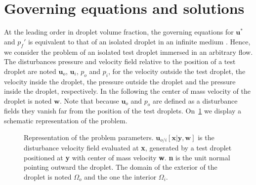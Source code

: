 



\section{Governing equations and solutions}


At the leading order in droplet volume fraction, the governing equations for $\textbf{u}^*$ and $p_f'$ is equivalent to that of an isolated droplet in an infinite medium \citet{hinch1977averaged}. 
Hence, we consider the problem of an isolated test droplet immersed in an arbitrary flow. 
The disturbances pressure and velocity field relative to the position of a test droplet are noted $\textbf{u}_{o}$, $\textbf{u}_{i}$, $p_{o}$ and $p_{i}$, for the velocity outside the test droplet, the velocity inside the droplet, the pressure outside the droplet and the pressure inside the droplet, respectively. 
In the following the center of mass velocity of the droplet is noted $\textbf{w}$. 
Note that because $\textbf{u}_o$ and $p_o$ are defined as a disturbance fields they vanish far from the position of the test droplets. 
On~\ref{fig:disturbance} we display a schematic representation of the problem. 
\begin{figure}[h!]
    \centering
    \caption{Representation of the problem parameters. $\textbf{u}_{o/i}[\textbf{x}|\textbf{y},\textbf{w}]$ is the disturbance velocity field evaluated at \textbf{x}, generated by a test droplet positioned at \textbf{y} with center of mass velocity \textbf{w}. \textbf{n} is the unit normal  pointing outward the droplet. 
    The domain of the exterior of the droplet is noted $\Omega_o$ and the one the interior $\Omega_i$.}
    \label{fig:disturbance}
\end{figure}

